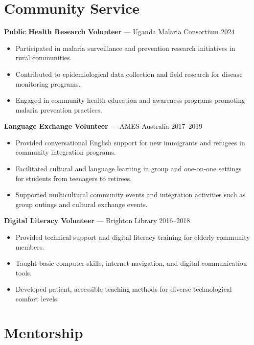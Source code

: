 \documentclass[10pt,letterpaper]{article}
\begin{document}
\section*{Community Service}

\textbf{Public Health Research Volunteer} — Uganda Malaria Consortium \hfill 2024\\[-1.5em]
\begin{itemize}
  \item Participated in malaria surveillance and prevention research initiatives in rural communities.
  \item Contributed to epidemiological data collection and field research for disease monitoring programs.
  \item Engaged in community health education and awareness programs promoting malaria prevention practices.
\end{itemize}

\textbf{Language Exchange Volunteer} — AMES Australia \hfill 2017--2019\\[-1.5em]
\begin{itemize}
  \item Provided conversational English support for new immigrants and refugees in community integration programs.
  \item Facilitated cultural and language learning in group and one-on-one settings for students from teenagers to retirees.
  \item Supported multicultural community events and integration activities such as group outings and cultural exchange events.
\end{itemize}

\textbf{Digital Literacy Volunteer} — Brighton Library \hfill 2016--2018\\[-1.5em]
\begin{itemize}
  \item Provided technical support and digital literacy training for elderly community members.
  \item Taught basic computer skills, internet navigation, and digital communication tools.
  \item Developed patient, accessible teaching methods for diverse technological comfort levels.
\end{itemize}

\section*{Mentorship}
\end{document}
